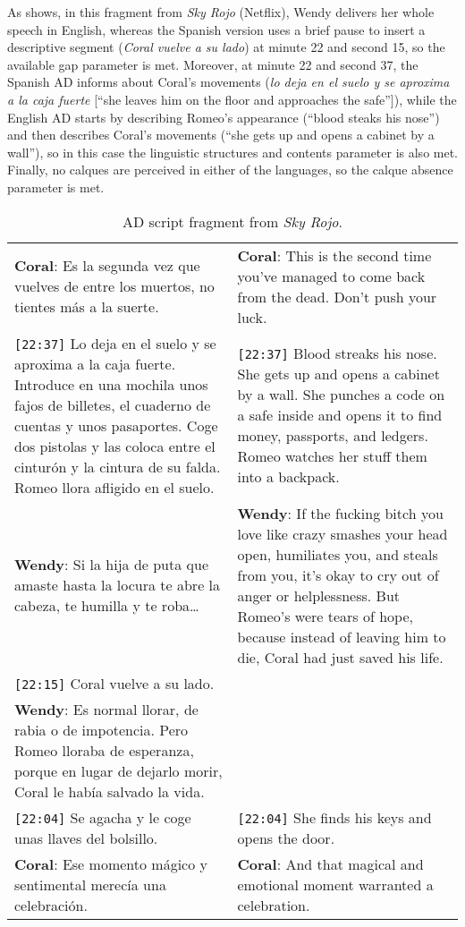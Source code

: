 \documentclass[english]{textolivre}
\begin{document}
As  shows, in this fragment from \textit{Sky Rojo} (Netflix), Wendy delivers her whole speech in English, whereas the Spanish version uses a brief pause to insert a descriptive segment (\textit{Coral vuelve a su lado}) at minute 22 and second 15, so the available gap parameter is met. Moreover, at minute 22 and second 37, the Spanish AD informs about Coral’s movements (\textit{lo deja en el suelo y se aproxima a la caja fuerte} [“she leaves him on the floor and approaches the safe”]), while the English AD starts by describing Romeo’s appearance (“blood steaks his nose”) and then describes Coral’s movements (“she gets up and opens a cabinet by a wall”), so in this case the linguistic structures and contents parameter is also met. Finally, no calques are perceived in either of the languages, so the calque absence parameter is met.

\begin{table}[h!]
\centering
\begin{threeparttable}
\caption{AD script fragment from \textit{Sky Rojo}.}
\label{tbl4}
\begin{tabular}{p{7cm} p{7cm}}
\toprule
\textbf{Coral}: Es la segunda vez que vuelves de entre los muertos, no tientes más a la suerte. &
\textbf{Coral}: This is the second time you’ve managed to come back from the dead. Don’t push your luck.  \\ 
\texttt{[22:37]} Lo deja en el suelo y se aproxima a la caja fuerte. Introduce en una mochila unos fajos de billetes, el cuaderno de cuentas y unos pasaportes. Coge dos pistolas y las coloca entre el cinturón y la cintura de su falda. Romeo llora afligido en el suelo. &
\texttt{[22:37]} Blood streaks his nose. She gets up and opens a cabinet by a wall. She punches a code on a safe inside and opens it to find money, passports, and ledgers. Romeo watches her stuff them into a backpack.    \\ 
\textbf{Wendy}: Si la hija de puta que amaste hasta la locura te abre la cabeza, te humilla y te roba… &
\textbf{Wendy}: If the fucking bitch you love like crazy smashes your head open, humiliates you, and steals from you, it’s okay to cry out of anger or helplessness. But Romeo’s were tears of hope, because instead of leaving him to die, Coral had just saved his life.     \\ 
\texttt{[22:15]} Coral vuelve a su lado. & \\
\textbf{Wendy}: Es normal llorar, de rabia o de impotencia. Pero Romeo lloraba de esperanza, porque en lugar de dejarlo morir, Coral le había salvado la vida. & \\
\texttt{[22:04]} Se agacha y le coge unas llaves del bolsillo. &
\texttt{[22:04]} She finds his keys and opens the door. \\
\textbf{Coral}: Ese momento mágico y sentimental merecía una celebración. &
\textbf{Coral}: And that magical and emotional moment warranted a celebration. \\
\bottomrule
\end{tabular}
\end{threeparttable}
\end{table}
\end{document}
